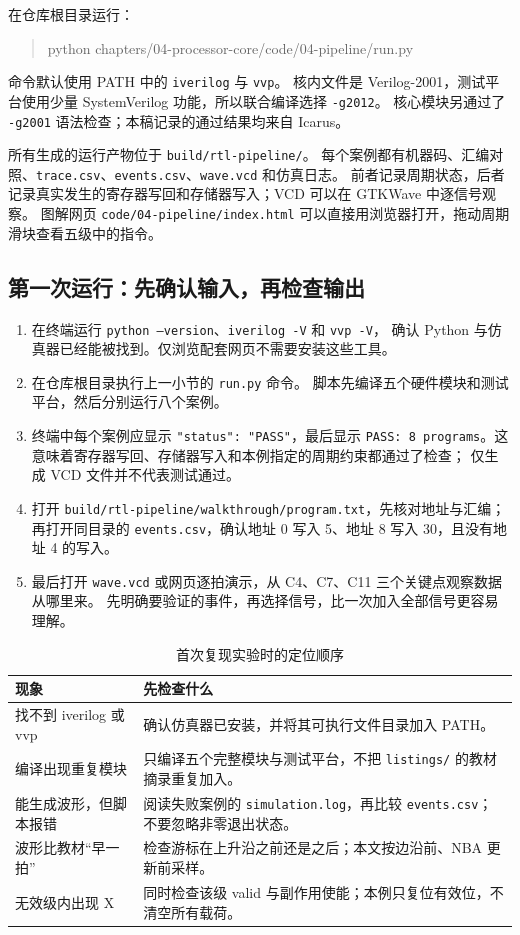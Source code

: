 在仓库根目录运行：
\begin{quote}\ttfamily\small
python chapters/04-processor-core/code/04-pipeline/run.py
\end{quote}
命令默认使用 PATH 中的 \texttt{iverilog} 与 \texttt{vvp}。
核内文件是 Verilog-2001，测试平台使用少量 SystemVerilog 功能，所以联合编译选择 \texttt{-g2012}。
核心模块另通过了 \texttt{-g2001} 语法检查；本稿记录的通过结果均来自 Icarus。

所有生成的运行产物位于 \texttt{build/rtl-pipeline/}。
每个案例都有机器码、汇编对照、\texttt{trace.csv}、\texttt{events.csv}、\texttt{wave.vcd} 和仿真日志。
前者记录周期状态，后者记录真实发生的寄存器写回和存储器写入；VCD 可以在 GTKWave 中逐信号观察。
图解网页 \texttt{code/04-pipeline/index.html} 可以直接用浏览器打开，拖动周期滑块查看五级中的指令。

\subsection{第一次运行：先确认输入，再检查输出}

\begin{enumerate}
\item 在终端运行 \texttt{python --version}、\texttt{iverilog -V} 和 \texttt{vvp -V}，
确认 Python 与仿真器已经能被找到。仅浏览配套网页不需要安装这些工具。
\item 在仓库根目录执行上一小节的 \texttt{run.py} 命令。
脚本先编译五个硬件模块和测试平台，然后分别运行八个案例。
\item 终端中每个案例应显示 \texttt{"status": "PASS"}，最后显示
\texttt{PASS: 8 programs}。这意味着寄存器写回、存储器写入和本例指定的周期约束都通过了检查；
仅生成 VCD 文件并不代表测试通过。
\item 打开 \texttt{build/rtl-pipeline/walkthrough/program.txt}，先核对地址与汇编；
再打开同目录的 \texttt{events.csv}，确认地址 0 写入 5、地址 8 写入 30，且没有地址 4 的写入。
\item 最后打开 \texttt{wave.vcd} 或网页逐拍演示，从 C4、C7、C11 三个关键点观察数据从哪里来。
先明确要验证的事件，再选择信号，比一次加入全部信号更容易理解。
\end{enumerate}

\begin{table}[htbp]
\centering\small
\caption{首次复现实验时的定位顺序}\label{tab:ch4-first-run}
\begin{tabularx}{\linewidth}{p{.29\linewidth}Y}
\toprule
现象 & 先检查什么 \\\midrule
找不到 iverilog 或 vvp & 确认仿真器已安装，并将其可执行文件目录加入 PATH。\\
编译出现重复模块 & 只编译五个完整模块与测试平台，不把 \texttt{listings/} 的教材摘录重复加入。\\
能生成波形，但脚本报错 & 阅读失败案例的 \texttt{simulation.log}，再比较 \texttt{events.csv}；不要忽略非零退出状态。\\
波形比教材“早一拍” & 检查游标在上升沿之前还是之后；本文按边沿前、NBA 更新前采样。\\
无效级内出现 X & 同时检查该级 valid 与副作用使能；本例只复位有效位，不清空所有载荷。\\
\bottomrule
\end{tabularx}
\end{table}

